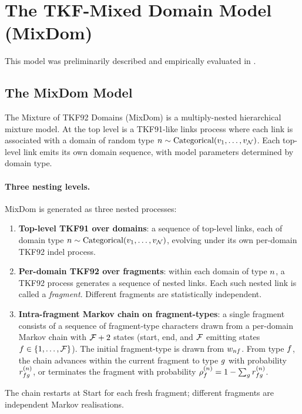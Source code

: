 \section{The TKF-Mixed Domain Model (MixDom)}

This model was preliminarily described and empirically evaluated in \cite{LargeHolmes2026}.

\subsection{The MixDom Model}
\label{sec:mixdom}
\label{sec:nestpairhmm}

The Mixture of TKF92 Domains (MixDom) is a multiply-nested hierarchical mixture model. At the top level is a TKF91-like links process where each link is associated with a domain of random type $n \sim {\mbox{Categorical}}(v_1,\ldots,v_{\mathcal{N}})$.
Each top-level link emits its own domain sequence, with model parameters determined by domain type.

\paragraph{Three nesting levels.}
MixDom is generated as three nested processes:
\begin{enumerate}
  \item \textbf{Top-level TKF91 over domains}: a sequence of top-level
    links, each of domain type $n \sim {\mbox{Categorical}}(v_1,\ldots,v_{\mathcal{N}})$,
    evolving under its own per-domain TKF92 indel process.
  \item \textbf{Per-domain TKF92 over fragments}: within each domain of
    type $n$, a TKF92 process generates a sequence of nested links.
    Each such nested link is called a \emph{fragment}. Different fragments
    are statistically independent.
  \item \textbf{Intra-fragment Markov chain on fragment-types}: a single
    fragment consists of a sequence of fragment-type characters drawn
    from a per-domain Markov chain with $\mathcal{F}+2$ states (start, end, and
    $\mathcal{F}$ emitting states $f \in \{1,\ldots,\mathcal{F}\}$). The initial
    fragment-type is drawn from $w_{nf}$. From type
    $f$, the chain advances within the current fragment to type
    $g$ with probability $r^{(n)}_{fg}$, or
    terminates the fragment with probability
    $\rho^{(n)}_f = 1 - \sum_{g} r^{(n)}_{fg}$.
\end{enumerate}
The chain restarts at Start for each fresh fragment; different fragments
are independent Markov realisations.

